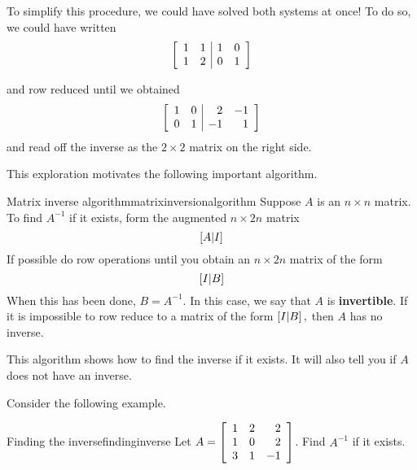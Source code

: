 To simplify this procedure, we could have solved both systems at once!
To do so, we could have written
\begin{equation*}
\left[
\begin{array}{rr|rr}
1 & 1 & 1 & 0 \\
1 & 2 & 0 & 1
\end{array}
\right]
\end{equation*}

and row reduced until we obtained
\begin{equation*}
\left[
\begin{array}{rr|rr}
1 & 0 & 2 & -1 \\
0 & 1 & -1 & 1
\end{array}
\right]
\end{equation*}
and read off the inverse as the $2\times 2$ matrix on the right side.

This exploration motivates the following important algorithm.

\begin{algorithm}{Matrix inverse algorithm}{matrixinversionalgorithm}
Suppose $A$ is an $n\times n$ matrix. To find $A^{-1}$ if it exists, form
the augmented $n\times 2n$ matrix
\begin{equation*}
\left[ A|I\right]
\end{equation*}
If possible do row operations until you obtain an $n\times 2n$
matrix of the form
\begin{equation*}
\left[ I|B\right]  
\end{equation*}
When this has been done, $B=A^{-1}.$ In this case, we say that $A$ is \textbf{invertible}. 
If it is impossible to row reduce to a
matrix of the form $\left[ I|B\right] ,$ then $A$ has no inverse.
\end{algorithm}

This algorithm shows how to find the inverse if it exists. It will also tell you if
$A$ does not have an inverse. 

Consider the following example.

\begin{example}{Finding the inverse}{findinginverse}
Let $A=\left[
\begin{array}{rrr}
1 & 2 & 2 \\
1 & 0 & 2 \\
3 & 1 & -1
\end{array}
\right] $. Find $A^{-1}$ if it exists.
\end{example}

